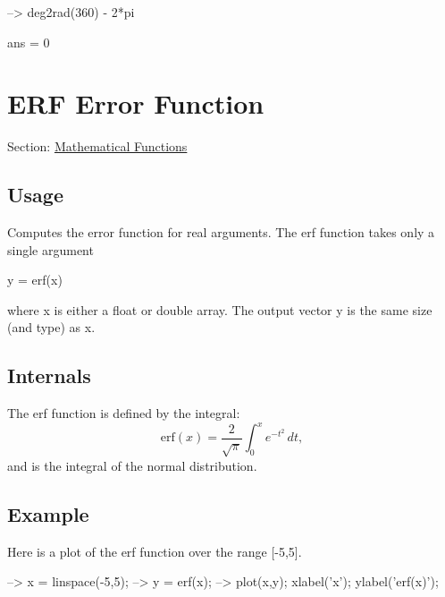 \begin{DoxyVerbInclude}
--> deg2rad(360) - 2*pi

ans = 
 0 
\end{DoxyVerbInclude}
 \hypertarget{mathfunctions_erf}{}\section{E\-R\-F Error Function}\label{mathfunctions_erf}
Section\-: \hyperlink{sec_mathfunctions}{Mathematical Functions} \hypertarget{vtkwidgets_vtkxyplotwidget_Usage}{}\subsection{Usage}\label{vtkwidgets_vtkxyplotwidget_Usage}
Computes the error function for real arguments. The {\ttfamily erf} function takes only a single argument \begin{DoxyVerb}  y = erf(x)
\end{DoxyVerb}
 where {\ttfamily x} is either a {\ttfamily float} or {\ttfamily double} array. The output vector {\ttfamily y} is the same size (and type) as {\ttfamily x}. \hypertarget{transforms_svd_Function}{}\subsection{Internals}\label{transforms_svd_Function}
The erf function is defined by the integral\-: \[ \mathrm{erf}(x) = \frac{2}{\sqrt{\pi}}\int_{0}^{x} e^{-t^2} \, dt, \] and is the integral of the normal distribution. \hypertarget{variables_struct_Example}{}\subsection{Example}\label{variables_struct_Example}
Here is a plot of the erf function over the range {\ttfamily \mbox{[}-\/5,5\mbox{]}}.


\begin{DoxyVerbInclude}
--> x = linspace(-5,5);
--> y = erf(x);
--> plot(x,y); xlabel('x'); ylabel('erf(x)');
\end{DoxyVerbInclude}


